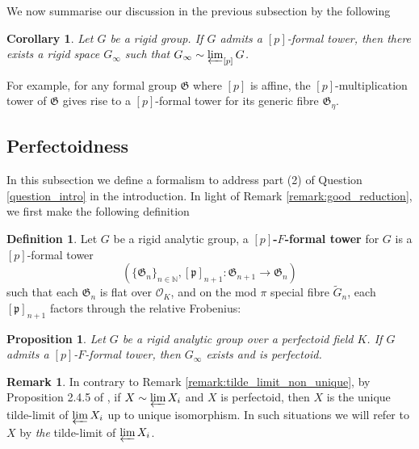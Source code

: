 \documentclass[10pt,oneside]{amsart}
\newtheorem{proposition}[theorem]{Proposition}
\newtheorem{corollary}[theorem]{Corollary}
\theoremstyle{definition}
\newtheorem{definition}[theorem]{Definition}
\newtheorem{remark}[theorem]{Remark}
\begin{document}
	We now summarise our discussion in the previous subsection by the following
	\begin{corollary}
		Let $G$ be a rigid group. If $G$ admits a $[p]$-formal tower, then there exists a rigid space $G_\infty$ such that $G_\infty \sim \varprojlim_{[p]}G$.
	\end{corollary}
	For example, for any formal group $\mathfrak G$ where $[p]$ is affine, the $[p]$-multiplication tower of $\mathfrak G$ gives rise to a $[p]$-formal tower for its generic fibre $\mathfrak G_\eta$. 
	
	
	
	
	\subsection{Perfectoidness}  \label{subsection:perfectoid_tilde_limit}

In this subsection we define a formalism to address part (2) of Question \ref{question_intro} in the introduction. In light of Remark \ref{remark:good_reduction}, we first make the following definition
	
	\begin{definition}
		Let $G$ be a rigid analytic group, a \textbf{$[p]$-$F$-formal tower} for $G$ is a $[p]$-formal tower 
		$$(\{\mathfrak G_n\}_{n\in \mathbb N}, [\mathfrak p]_{n+1}:\mathfrak G_{n+1}\rightarrow \mathfrak G_{n})$$ such that each $\mathfrak G_n$ is flat over $\mathcal O_K$, and on the mod $\pi$ special fibre  $\tilde{G}_n$, each   $[\mathfrak p]_{n+1}$ factors through the relative Frobenius:
				\begin{center}
				\end{center}
	 
	\end{definition}	
	
	 	\begin{proposition}\label{existence of p-F-formal tower implies perfectoid}
		Let $G$ be a rigid analytic group over a perfectoid field $K$. If $G$ admits a $[p]$-$F$-formal tower, then $G_\infty$ exists and is perfectoid. 
	\end{proposition}
	 
	\begin{remark} \label{remark:tilde_limit_unique}
In contrary to Remark \ref{remark:tilde_limit_non_unique}, by Proposition 2.4.5 of \cite{SW}, if $X \sim \varprojlim X_i$ and $X$ is perfectoid, then $X$ is the unique tilde-limit of $ \varprojlim X_i$ up to unique isomorphism. In such situations we will refer to $X$ by \textit{the} tilde-limit of $ \varprojlim X_i$. 
	\end{remark} 
	 
\end{document}
